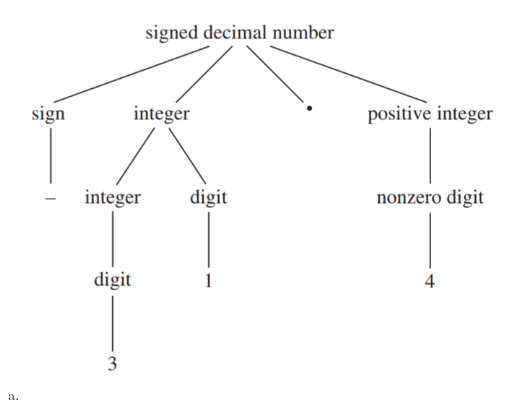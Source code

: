 \documentclass[../main.tex]{subfiles}
\begin{document}
\begin{enumerate}[a)]
\begin{grammar}
			<positive integer> ::= <integer><nonzero digit>
			<nonzero integer><integer>
			\alt <nonzero digit>
		\end{grammar}
	\item \includegraphics[scale=0.4]{img/29cA.png}
\end{enumerate}
\end{document}
